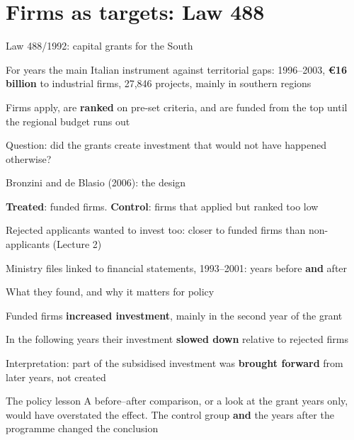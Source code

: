 \documentclass[aspectratio=169,xcolor=table]{beamer}
\begin{document}
\section{Firms as targets: Law 488}

\begin{frame}{Law 488/1992: capital grants for the South}
\footnotesize
\bi
  \item For years the main Italian instrument against territorial gaps: 1996--2003, \textbf{€16 billion} to industrial firms, 27,846 projects, mainly in southern regions
  \item Firms apply, are \textbf{ranked} on pre-set criteria, and are funded from the top until the regional budget runs out
  \item Question: did the grants create investment that would not have happened otherwise?
\ei
\vspace{0.1cm}
\begin{block}{Bronzini and de Blasio (2006): the design}
\bi
  \item \textbf{Treated}: funded firms. \textbf{Control}: firms that applied but ranked too low
  \item Rejected applicants wanted to invest too: closer to funded firms than non-applicants (Lecture 2)
  \item Ministry files linked to financial statements, 1993--2001: years before \textbf{and} after
\ei
\end{block}
\end{frame}

\begin{frame}{What they found, and why it matters for policy}
\small
\bi
  \item Funded firms \textbf{increased investment}, mainly in the second year of the grant
  \item In the following years their investment \textbf{slowed down} relative to rejected firms
  \item Interpretation: part of the subsidised investment was \textbf{brought forward} from later years, not created
\ei
\vspace{0.15cm}
\begin{exampleblock}{The policy lesson}
A before--after comparison, or a look at the grant years only, would have overstated the effect. The control group \textbf{and} the years after the programme changed the conclusion
\end{exampleblock}
\end{frame}
\end{document}
